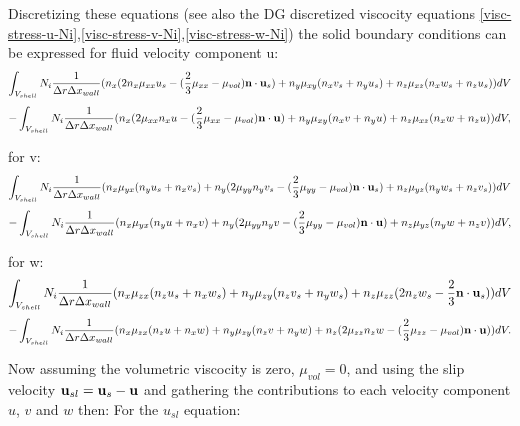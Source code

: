 Discretizing these equations (see also the DG discretized viscocity equations \ref{visc-stress-u-Ni},\ref{visc-stress-v-Ni},\ref{visc-stress-w-Ni}) the solid boundary conditions can be expressed  
for fluid velocity component u:
\begin{equation}
\int_{V_{shell}} 
N_i \frac{1}{\Delta r \Delta x_{wall}} 
({n_x} 
(
2 n_x \mu_{xx}u_s 
-(\frac{2}{3} \mu_{xx}-\mu_{vol}){\bf n}\cdot{\bf u}_s 
)
+
 {n_y} \mu_{xy}
( n_x  v_s + n_y u_s) 
+
{n_z} \mu_{xz}
( n_x w_s + n_z u_s ) 
 )d V
\label{visc-stress-u-n-2-solid} 
\end{equation}
\begin{equation}
- \int_{V_{shell}} 
N_i\frac{1}{\Delta r \Delta x_{wall} } ({n_x}   (2\mu_{xx}
n_x u 
-(\frac{2}{3}\mu_{xx}-\mu_{vol}) {\bf n}\cdot{\bf u} 
)
+
 {n_y} \mu_{xy}
( n_x  v + n_y u) 
+
{n_z} \mu_{xz}
( n_x w + n_z u ) 
 )d V,
\label{visc-stress-u-n-2-fluid} 
\end{equation}


for v:
\begin{equation}
\int_{V_{shell}} 
N_i\frac{1}{\Delta r \Delta x_{wall}}
({n_x} \mu_{yx}
(n_y u_s + n_x v_s) 
+
{n_y}(2\mu_{yy}
n_y v_s 
-(\frac{2}{3}\mu_{yy}-\mu_{vol}) {\bf n} \cdot{\bf u}_s 
)
+
{n_z} \mu_{yz}
(n_y w_s + n_z v_s )
 )dV
\label{visc-stress-v-n-2-solid} 
\end{equation}
\begin{equation}
-  \int_{V_{shell}} 
N_i \frac{1}{\Delta r \Delta x_{wall}}
({n_x} \mu_{yx}
(n_y u + n_x v) 
+
{n_y}(2\mu_{yy}
n_y v 
-(\frac{2}{3}\mu_{yy}-\mu_{vol}) {\bf n} \cdot{\bf u}
)
+
{n_z} \mu_{yz}
(n_y w + n_z v )
 )d V,
\label{visc-stress-v-n-2-fluid} 
\end{equation}


for w:
\begin{equation}
\int_{V_{shell}} 
N_i \frac{1}{\Delta r \Delta x_{wall}}
({n_x} \mu_{zx}
( n_z u_s + n_x w_s )
+
{n_y} \mu_{zy}
( n_z v_s + n_y w_s )
+
{n_z} \mu_{zz}
(
2 n_z w_s 
-\frac{2}{3} {\bf n} \cdot{\bf u}_s 
) )d V 
\label{visc-stress-w-n-2-solid} 
\end{equation}
\begin{equation}
-\int_{V_{shell}} 
N_i \frac{1}{\Delta r \Delta x_{wall}}
({n_x} \mu_{zx}
( n_z u + n_x w )
+
{n_y} \mu_{zy}
( n_z v + n_y w )
+
{n_z} (2\mu_{zz}
n_z w 
-(\frac{2}{3}\mu_{zz}-\mu_{vol}) {\bf n} \cdot{\bf u}
) )d V. 
\label{visc-stress-w-n-2-fluid} 
\end{equation}

Now assuming the volumetric viscocity is zero, $\mu_{vol}=0$, 
and using the slip velocity ${\bf u}_{sl} = {\bf u}_{s} -{\bf u}$ and gathering the 
contributions to each velocity component $u$, $v$ and $w$ then: 
For the $u_{sl}$ equation:

